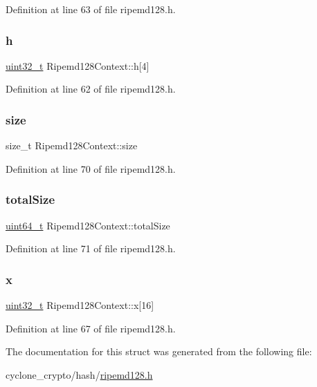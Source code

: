 Definition at line 63 of file ripemd128.\+h.

\mbox{\label{structRipemd128Context_a8b4ec53886b8659a94892bb63c66a3a1}} 
\subsubsection{\texorpdfstring{h}{h}}
{\footnotesize\ttfamily \hyperlink{stdint_8h_a435d1572bf3f880d55459d9805097f62}{uint32\+\_\+t} Ripemd128\+Context\+::h\mbox{[}4\mbox{]}}



Definition at line 62 of file ripemd128.\+h.

\mbox{\label{structRipemd128Context_af726b1c8f3d25c78e280318febcf201f}} 
\subsubsection{\texorpdfstring{size}{size}}
{\footnotesize\ttfamily size\+\_\+t Ripemd128\+Context\+::size}



Definition at line 70 of file ripemd128.\+h.

\mbox{\label{structRipemd128Context_a145c1c9e3d660df845d115ba0bfd5c81}} 
\subsubsection{\texorpdfstring{total\+Size}{totalSize}}
{\footnotesize\ttfamily \hyperlink{stdint_8h_aec6fcb673ff035718c238c8c9d544c47}{uint64\+\_\+t} Ripemd128\+Context\+::total\+Size}



Definition at line 71 of file ripemd128.\+h.

\mbox{\label{structRipemd128Context_a87f08b90480c53e7d624449e178339c9}} 
\subsubsection{\texorpdfstring{x}{x}}
{\footnotesize\ttfamily \hyperlink{stdint_8h_a435d1572bf3f880d55459d9805097f62}{uint32\+\_\+t} Ripemd128\+Context\+::x\mbox{[}16\mbox{]}}



Definition at line 67 of file ripemd128.\+h.



The documentation for this struct was generated from the following file\+:\begin{DoxyCompactItemize}
\item 
cyclone\+\_\+crypto/hash/\hyperlink{ripemd128_8h}{ripemd128.\+h}\end{DoxyCompactItemize}
